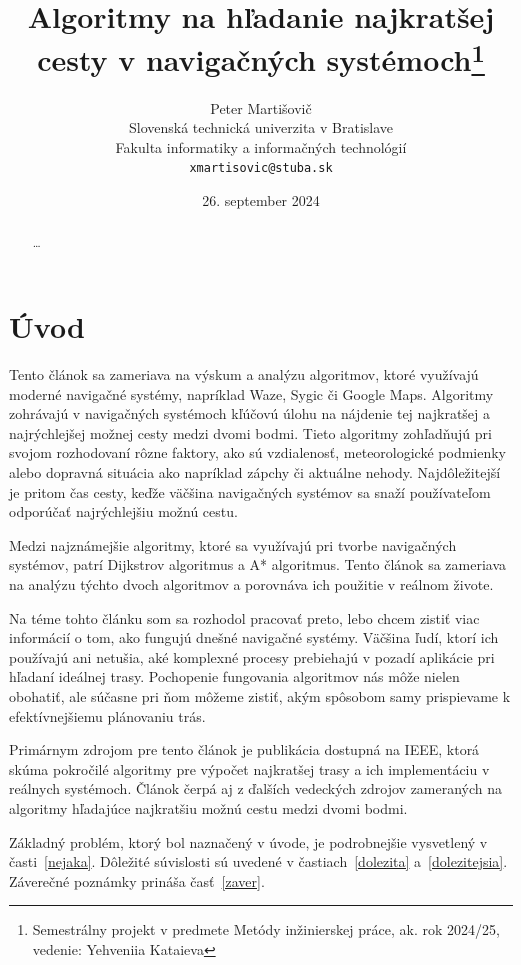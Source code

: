 \documentclass[10pt,twocolumn,twoside,slovak,a4paper]{article}
\title{Algoritmy na hľadanie najkratšej cesty v navigačných systémoch\thanks{Semestrálny projekt v predmete Metódy inžinierskej práce, ak. rok 2024/25, vedenie: Yehveniia Kataieva}} %
\author{Peter Martišovič\\[2pt]
	{\small Slovenská technická univerzita v Bratislave}\\
	{\small Fakulta informatiky a informačných technológií}\\
	{\small \texttt{xmartisovic@stuba.sk}}
	}
\date{\small 26. september 2024} %
\begin{document}
\maketitle

\begin{abstract}
\ldots
\end{abstract}



\section{Úvod}

Tento článok sa zameriava na výskum a analýzu algoritmov, ktoré využívajú moderné navigačné systémy, napríklad Waze, Sygic či Google Maps. Algoritmy zohrávajú v navigačných systémoch kľúčovú úlohu na nájdenie tej najkratšej a najrýchlejšej možnej cesty medzi dvomi bodmi. Tieto algoritmy zohľadňujú pri svojom rozhodovaní rôzne faktory, ako sú vzdialenosť, meteorologické podmienky alebo dopravná situácia ako napríklad zápchy či aktuálne nehody. Najdôležitejší je pritom čas cesty, keďže väčšina navigačných systémov sa snaží používateľom odporúčať najrýchlejšiu možnú cestu.

Medzi najznámejšie algoritmy, ktoré sa využívajú pri tvorbe navigačných systémov, patrí Dijkstrov algoritmus a A* algoritmus. Tento článok sa zameriava na analýzu týchto dvoch algoritmov a porovnáva ich použitie v reálnom živote.

Na téme tohto článku som sa rozhodol pracovať preto, lebo chcem zistiť viac informácií o tom, ako fungujú dnešné navigačné systémy. Väčšina ľudí, ktorí ich používajú ani netušia, aké komplexné procesy prebiehajú v pozadí aplikácie pri hľadaní ideálnej trasy. Pochopenie fungovania algoritmov nás môže nielen obohatiť, ale súčasne pri ňom môžeme zistiť, akým spôsobom samy prispievame k efektívnejšiemu plánovaniu trás.

Primárnym zdrojom pre tento článok je publikácia dostupná na IEEE, ktorá skúma pokročilé algoritmy pre výpočet najkratšej trasy a ich implementáciu v reálnych systémoch. Článok čerpá aj z ďalších vedeckých zdrojov zameraných na algoritmy hľadajúce najkratšiu možnú cestu medzi dvomi bodmi.

Základný problém, ktorý bol naznačený v úvode, je podrobnejšie vysvetlený v časti~\ref{nejaka}.
Dôležité súvislosti sú uvedené v častiach~\ref{dolezita} a~\ref{dolezitejsia}.
Záverečné poznámky prináša časť~\ref{zaver}.
\end{document}
